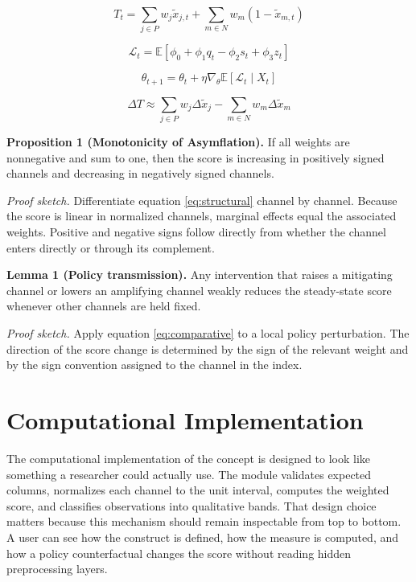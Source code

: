 \documentclass[12pt]{article}
\begin{document}
\begin{equation}
T_t = \sum_{j \in P} w_j \tilde{x}_{j,t} + \sum_{m \in N} w_m (1 - \tilde{x}_{m,t})
\label{eq:structural}
\end{equation}

\begin{equation}
\mathcal{L}_t = \mathbb{E}\left[\phi_0 + \phi_1 q_t - \phi_2 s_t + \phi_3 z_t\right]
\label{eq:loss}
\end{equation}

\begin{equation}
\theta_{t+1} = \theta_t + \eta \nabla_\theta \mathbb{E}[\mathcal{L}_t \mid X_t]
\label{eq:update}
\end{equation}

\begin{equation}
\Delta T \approx \sum_{j \in P} w_j \Delta \tilde{x}_j - \sum_{m \in N} w_m \Delta \tilde{x}_m
\label{eq:comparative}
\end{equation}

\textbf{Proposition 1 (Monotonicity of Asymflation).} If all weights are nonnegative and sum to one, then the score is increasing in positively signed channels and decreasing in negatively signed channels.

\textit{Proof sketch.} Differentiate equation \eqref{eq:structural} channel by channel. Because the score is linear in normalized channels, marginal effects equal the associated weights. Positive and negative signs follow directly from whether the channel enters directly or through its complement.

\textbf{Lemma 1 (Policy transmission).} Any intervention that raises a mitigating channel or lowers an amplifying channel weakly reduces the steady-state score whenever other channels are held fixed.

\textit{Proof sketch.} Apply equation \eqref{eq:comparative} to a local policy perturbation. The direction of the score change is determined by the sign of the relevant weight and by the sign convention assigned to the channel in the index.

\section{Computational Implementation}
The computational implementation of the concept is designed to look like something a researcher could actually use. The module validates expected columns, normalizes each channel to the unit interval, computes the weighted score, and classifies observations into qualitative bands. That design choice matters because this mechanism should remain inspectable from top to bottom. A user can see how the construct is defined, how the measure is computed, and how a policy counterfactual changes the score without reading hidden preprocessing layers.
\end{document}
